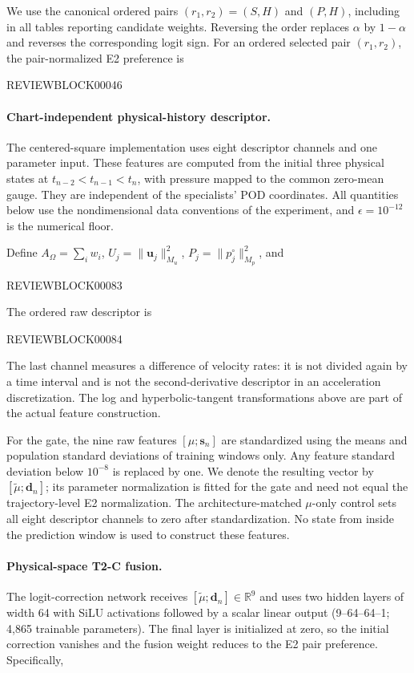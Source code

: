 \documentclass{article}
\begin{document}
We use the canonical ordered pairs $(r_1,r_2)=(S,H)$ and $(P,H)$, including in all tables reporting candidate weights. Reversing the order replaces $\alpha$ by $1-\alpha$ and reverses the corresponding logit sign. For an ordered selected pair $(r_1,r_2)$, the pair-normalized E2
preference is


REVIEWBLOCK00046




\paragraph{Chart-independent physical-history descriptor.}
The centered-square implementation uses eight descriptor channels and one parameter input. These features are computed from the initial three physical states at $t_{n-2}<t_{n-1}<t_n$, with pressure mapped to the common zero-mean gauge. They are independent of the specialists' POD coordinates. All quantities below use the nondimensional data conventions of the experiment, and $\epsilon=10^{-12}$ is the numerical floor.

Define $A_\Omega=\sum_i w_i$, $U_j=\|\bm u_j\|_{M_u}^2$, $P_j=\|p_j^\circ\|_{M_p}^2$, and


REVIEWBLOCK00083


The ordered raw descriptor is


REVIEWBLOCK00084


The last channel measures a difference of velocity rates: it is not divided again by a time interval and is not the second-derivative descriptor in an acceleration discretization. The log and hyperbolic-tangent transformations above are part of the actual feature construction.

For the gate, the nine raw features $[\mu;\bm s_n]$ are standardized using the means and population standard deviations of training windows only. Any feature standard deviation below $10^{-8}$ is replaced by one. We denote the resulting vector by $[\widetilde\mu;\bm d_n]$; its parameter normalization is fitted for the gate and need not equal the trajectory-level E2 normalization. The architecture-matched $\mu$-only control sets all eight descriptor channels to zero after standardization. No state from inside the prediction window is used to construct these features.


\paragraph{Physical-space T2-C fusion.}
The logit-correction network receives
$[\widetilde\mu;\bm d_n]\in\mathbb R^9$ and uses two hidden layers of width 64 with SiLU
activations followed by a scalar linear output (9--64--64--1; 4,865 trainable parameters).
The final layer is initialized at zero, so the initial correction vanishes
and the fusion weight reduces to the E2 pair preference.
Specifically,
\end{document}
